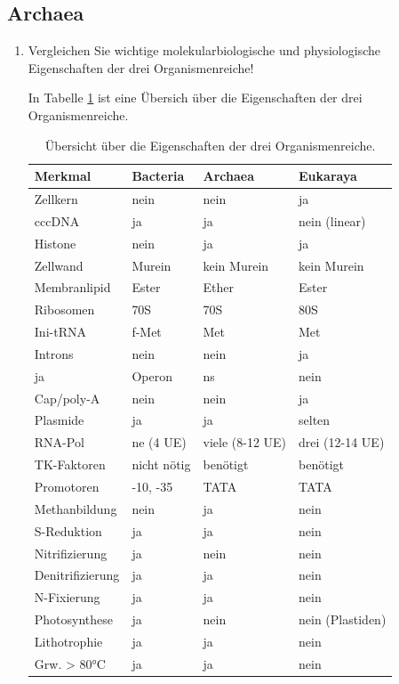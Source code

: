 \subsection{Archaea}
\begin{enumerate}
	\item Vergleichen Sie wichtige molekularbiologische und physiologische Eigenschaften der drei Organismenreiche!
		
		In Tabelle \ref{tab:domaenenuberblick} ist eine Übersich über die Eigenschaften der drei Organismenreiche.	

		\begin{table}[h!]
		\begin{center}
		\begin{tabular}{l l l l} 
		\toprule
		Merkmal		&	Bacteria		&	 Archaea				&	 Eukaraya		\\
		\midrule
		Zellkern 	&	nein			&	 nein					&	 ja		\\
		cccDNA		&	ja				&	 ja					&	 nein (linear)			\\
		Histone		&	nein			&	 ja					&	 ja		\\
		Zellwand		&	Murein		&	 kein Murein		&	 kein Murein		\\
		Membranlipid&	Ester			&	 Ether				&	 Ester		\\
		\midrule
		Ribosomen	&	70S			&	 70S					&	 80S		\\
		Ini-tRNA		&	f-Met			&	 Met					&	 Met		\\
		Introns 		&	nein			&	 nein					&	 ja		\\
		ja				&	Operon		&	 ns					&	 nein		\\
		Cap/poly-A 	&	nein			&	 nein					&	 ja		\\
		Plasmide		&	ja				&	 ja					&	 selten		\\
		RNA-Pol			&	ne (4 UE)	&	 viele (8-12 UE)	&	drei (12-14 UE)	\\
		TK-Faktoren		&	nicht nötig	&	 benötigt			&	benötigt		\\
		Promotoren		&	-10, -35		&	 TATA					&	TATA		\\
		\midrule
		Methanbildung		&	nein			&	 ja					&	nein		\\
		S-Reduktion		&	ja				&	 ja					&	nein		\\
		Nitrifizierung	&	ja				&	 nein					&	nein		\\
		Denitrifizierung		&	ja				&	 ja					&	nein		\\
		N-Fixierung		&	ja				&	 ja					&	nein		\\
		Photosynthese		&	ja				&	 nein					&	nein (Plastiden)	\\
		Lithotrophie	&	ja				&	 ja					&	nein		\\
		Grw. > 80°C		&	ja				&	 ja					&	nein		\\
		\bottomrule
		\end{tabular}
		\caption{Übersicht über die Eigenschaften der drei Organismenreiche.}
		\label{tab:domaenenuberblick}
		\end{center}
		\end{table}


\end{enumerate}
